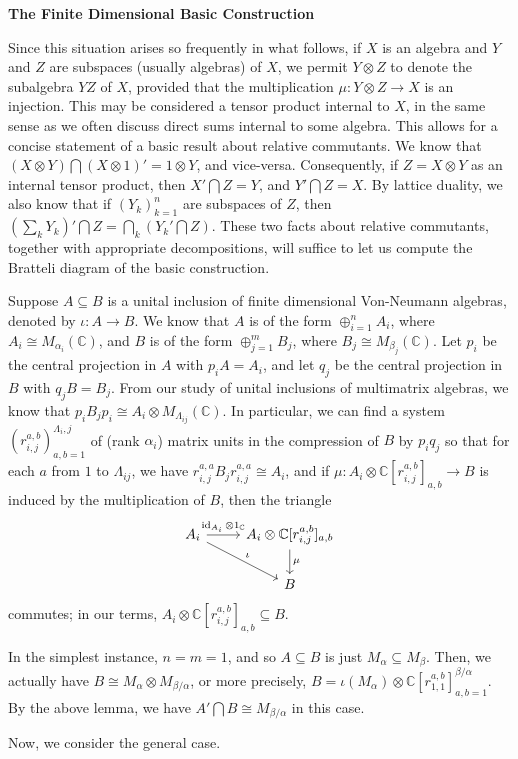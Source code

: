 \documentclass[a4paper,10pt]{report}
\newcommand{\C}{\mathbb{C}}
\newcommand{\tens}{\otimes}
\DeclareMathOperator{\id}{id}
\begin{document}

\pagestyle{fancy}	
\fancyhf{} %
\setlength{\headheight}{60pt} 

\begin{center}
	\textbf{The Finite Dimensional Basic Construction}
\end{center}

Since this situation arises so frequently in what follows, if $X$ is an algebra and $Y$ and $Z$ are subspaces (usually algebras) of $X$, we permit $Y\tens Z$ to denote the subalgebra $YZ$ of $X$, provided that the multiplication $\mu:Y\otimes Z\to X$ is an injection. This may be considered a tensor product internal to $X$, in the same sense as we often discuss direct sums internal to some algebra. 
This allows for a concise statement of a basic result about relative commutants. We know that $(X\tens Y)\bigcap(X\tens 1)'=1\tens Y$, and vice-versa. Consequently, if $Z=X\tens Y$ as an internal tensor product, then $X'\bigcap Z=Y$, and $Y'\bigcap Z=X$. %
By lattice duality, %
we also know that if $(Y_k)_{k=1}^n$ are subspaces of $Z$, then $(\sum_kY_k)'\bigcap Z=\bigcap_k(Y_k'\bigcap Z)$. These two facts about relative commutants, together with appropriate decompositions, will suffice to let us compute the Bratteli diagram of the basic construction. 

Suppose $A\subseteq B$ is a unital inclusion of finite dimensional Von-Neumann algebras, denoted by $\iota:A\to B$. We know that $A$ is of the form $\oplus_{i=1}^nA_i$, where $A_i\cong M_{\alpha_i}(\C)$, and $B$ is of the form $\oplus_{j=1}^mB_j$, where $B_j\cong M_{\beta_j}(\C)$. Let $p_i$ be the central projection in $A$ with $p_iA=A_i$, and let $q_j$ be the central projection in $B$ with $q_jB=B_j$. From our study of unital inclusions of multimatrix algebras, we know that $p_iB_jp_i\cong A_i\otimes M_{\Lambda_{ij}}(\C)$. In particular, we can find a system $(r_{i,j}^{a,b})_{a,b=1}^{\Lambda_i,j}$ of (rank $\alpha_i$) matrix units in the compression of $B$ by $p_iq_j$ so that for each $a$ from $1$ to $\Lambda_{ij}$, we have $r_{i,j}^{a,a}B_jr_{i,j}^{a,a}\cong A_i$, and if $\mu:A_i\otimes\C[r_{i,j}^{a,b}]_{a,b}\to B$ is induced by the multiplication of $B$, then the triangle 
\[\begin{tikzcd}
	A_i\ar[r,"\id_{A_i}\otimes1_{\C}"]\ar[dr,"\iota"] & A_i\otimes\C[r_{i,j}^{a,b}]_{a,b}\ar[d,"\mu"]\\
	& B
\end{tikzcd}\]
commutes; in our terms, $A_i\tens\C[r_{i,j}^{a,b}]_{a,b}\subseteq B$. 

In the simplest instance, $n=m=1$, and so $A\subseteq B$ is just $M_\alpha\subseteq M_\beta$. Then, we actually have $B\cong M_\alpha\tens M_{\beta/\alpha}$, or more precisely, $B=\iota(M_\alpha)\tens\C[r_{1,1}^{a,b}]_{a,b=1}^{\beta/\alpha}$. By the above lemma, we have $A'\bigcap B\cong M_{\beta/\alpha}$ in this case. 

Now, we consider the general case. 
\end{document}
